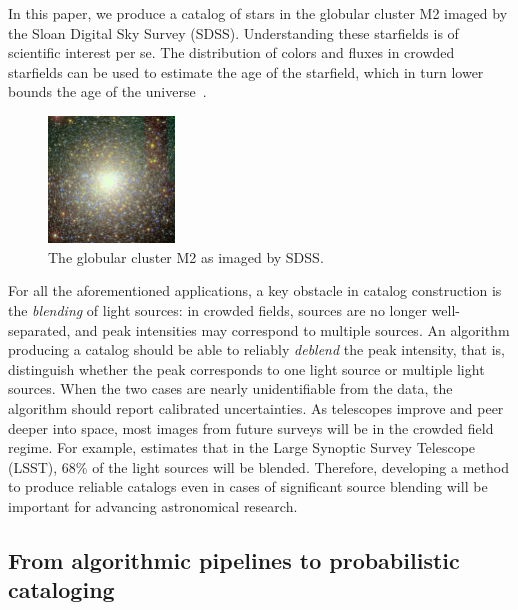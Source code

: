 In this paper, we produce a catalog of stars in the globular cluster M2 imaged by the Sloan Digital Sky Survey (SDSS). 
Understanding these starfields is of scientific interest per se.
The distribution of colors and fluxes in crowded starfields 
can be used to estimate the age 
of the starfield, which in turn lower bounds the 
age of the universe~\cite{Isochrome_fitting}. 


\begin{figure}[!tb]
  \centering
    \includegraphics[width=0.3\textwidth]{figures/m2.png}
  \caption{The globular cluster M2 as imaged by SDSS. }
\end{figure}

For all the aforementioned applications, a key obstacle 
in catalog construction is the {\itshape blending} of light sources: in crowded fields, sources are no longer well-separated, and peak intensities may correspond to multiple sources. An algorithm producing a catalog should be able to reliably {\itshape deblend} the peak intensity, that is, distinguish whether the peak corresponds to one light source or 
multiple light sources. When the two cases are nearly unidentifiable from the data, the algorithm should 
report calibrated uncertainties. As telescopes improve and peer deeper into space, most images from future surveys will be in the crowded field regime. 
For example, \cite{Bosch_2017_LSST} estimates that in the Large Synoptic Survey Telescope (LSST), 68\% of the light sources will be blended. Therefore, developing a method to produce reliable catalogs even in cases of significant source blending will be important for advancing astronomical research. 

\subsection{From algorithmic pipelines to probabilistic cataloging}

